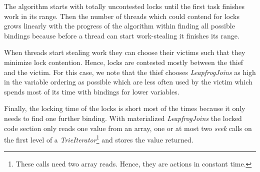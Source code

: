 The algorithm starts with totally uncontested locks until the first task finishes work in its
range.
Then the number of threads which could contend for locks grows linearly with the progress of the
algorithm within finding all possible bindings because before a thread can start work-stealing it
finishes its range.

When threads start stealing work they can choose their victims such that they minimize lock contention.
Hence, locks are contested mostly between the thief and the victim.
For this case, we note that the thief chooses \textit{LeapfrogJoins} as high in the variable ordering
as possible which are less often used by the victim which spends most of its time with bindings
for lower variables.

Finally, the locking time of the locks is short most of the times because it only needs to find
one further binding.
With materialized \textit{LeapfrogJoins} the locked code section only
reads one value from an array, one or at most two \textit{seek} calls on the first level of a
\textit{TrieIterator}\footnote{These calls need two array reads. Hence, they are actions in constant time.} and stores the value returned.

